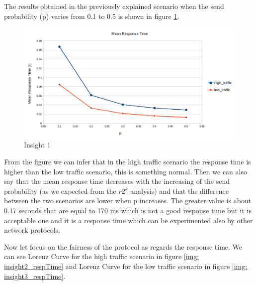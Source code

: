 \noindent The results obtained in the previously explained scenario when the send probability (p) varies from 0.1 to 0.5 is shown in figure \ref{img: insight1_respTime}.
\begin{figure}[H]
	\centering
	\includegraphics[width=\textwidth]{img/MeanResponseTimeInsight.png}
	\caption{Insight 1}
	\label{img: insight1_respTime}
\end{figure}

\noindent From the figure we can infer that in the high traffic scenario the response time is higher than the low traffic scenario, this is something normal. Then we can also say that the mean response time decreases with the increasing of the send probability (as we expected from the $r2^k$ analysis) and that the difference between the two scenarios are lower when p increases. The greater value is about 0.17 seconds that are equal to 170 ms which is not a good response time but it is acceptable one and it is a response time which can be experimented also by other network protocols.

\noindent Now let focus on the fairness of the protocol as regards the response time. We can see Lorenz Curve for the high traffic scenario in figure \ref{img: insight2_respTime} and Lorenz Curve for the low traffic scenario in figure \ref{img: insight3_respTime}.

